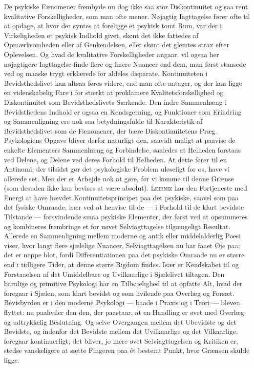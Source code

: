 \documentclass[12pt,a4paper,openany]{book}
\newcommand{\opage}[1]{\marginnote{\footnotesize\textit{[#1]}}}
\begin{document}
De psykiske Fænomener frembyde nu dog ikke saa stor Diskontinuitet og saa rent
kvalitative Forskelligheder, som man ofte mener. Nøjagtig Iagttagelse fører
ofte til at opdage, at hvor der syntes at foreligge et psykisk tomt Rum, var
der i Virkeligheden et psykisk Indhold givet, skønt det ikke fattedes af
Opmærksomheden eller af Genkendelsen, eller skønt det glemtes strax efter
Oplevelsen. Og hvad de kvalitative Forskelligheder angaar, vil ogsaa her
nøjagtigere Iagttagelse finde flere og finere Nuancer end dem, man først
stansede ved og maaske trygt
\opage{19}erklærede for aldeles disparate. Kontinuiteten i Bevidsthedslivet kan
altsaa føres videre, end man ofte antager, og der kan ligge en videnskabelig
Fare i for stærkt at proklamere Kvalitetsforskellighed og Diskontinuitet som
Bevidsthedslivets Særkende. Den indre Sammenhæng i Bevidsthedens Indhold er
ogsaa en Kendsgerning, og Funktioner som Erindring og Sammenligning ere nok saa
betydningsfulde til Karakteristik af Bevidsthedslivet som de Fænomener, der
bære Diskontinuitetens Præg. Psykologiens Opgave bliver derfor naturligt den,
saavidt muligt at paavise de enkelte Elementers Sammenhæng og Forbindelse,
saaledes at Helheden forstaas ved Delene, og Delene ved deres Forhold til
Helheden. At dette fører til en Antinomi, der tilsidst gør det psykologiske
Problem uløseligt for os, have vi allerede set. Men der er Arbejde nok at gøre,
før vi komme til denne Grænse (som desuden ikke kan bevises at være absolut).
\textsc{Leibniz} har den Fortjeneste med Energi at have hævdet
Kontinuitetsprincipet paa det psykiske, saavel som paa det fysiske Omraade,
især ved at henvise til de --- i Forhold til de klart bevidste Tilstande ---
forsvindende smaa psykiske Elementer, der først ved at opsummeres og kombineres
frembringe et for uøvet Selviagttagelse tilgængeligt Resultat. Allerede en
Sammenligning mellem moderne og antik eller middelalderlig Poesi viser, hvor
langt flere sjælelige Nuancer, Selviagttagelsen nu har faaet Øje paa; det er
neppe blot, fordi Differentiationen paa det psykiske Omraade nu er større end i
tidligere Tider, at denne større Rigdom findes. Især er Kendskabet til og
Forstaaelsen af det Umiddelbare og Uvilkaarlige i Sjælelivet tiltagen. Den
barnlige og primitive Psykologi har en Tilbøjelighed til at opfatte Alt, hvad
der foregaar i Sjælen, som klart bevidst og som hvilende paa Overlæg og Forsæt.
Bevisbyrden er i den moderne Psykologi --- baade i Praxis og i Teori --- bleven
flyttet: nu paahviler den den, der paastaar, at en Handling er øvet med Overlæg
og udtrykkelig Beslutning. Og selve Overgangen mellem det Ubevidste og det
Bevidste, og indenfor det Bevidste mellem det Uvilkaarlige og det Vilkaarlige,
foregaar kontinuerligt; det bliver, jo mere øvet Selviagttagelsen og
\opage{20}Kritiken er, stedse vanskeligere at sætte Fingeren paa ét bestemt
Punkt, hvor Grænsen skulde ligge.
\end{document}
